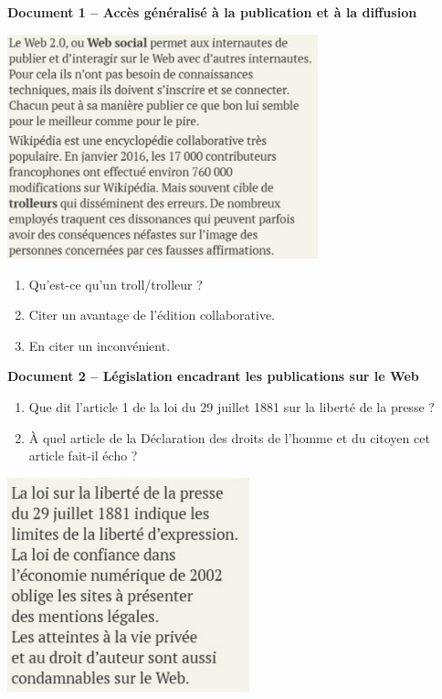 \documentclass[a4paper]{article}
\begin{document}
\medskip

\textbf{Document 1 -- Accès généralisé à la publication et à la diffusion} 

\begin{multicols}{2}
  \begin{center}
    \includegraphics[width=9cm]{web_2.0.png}
  \end{center}\columnbreak

  \vspace*{-3mm}

  \begin{enumerate}
    \item Qu'est-ce qu'un troll/trolleur ?
    \item Citer un avantage de l'édition collaborative.
    \item En citer un inconvénient.
  \end{enumerate}
\end{multicols}

\bigskip

\textbf{Document 2 -- Législation encadrant les publications sur le Web} 

\smallskip

\begin{multicols}{2}
  \begin{enumerate}[resume]
    \item Que dit l'article 1 de la loi du 29 juillet 1881 sur la liberté de la presse ?
    \item À quel article de la Déclaration des droits de l'homme et du citoyen cet article fait-il écho ?
  \end{enumerate}

  \begin{center}
    \includegraphics[width=7cm]{legislation_publications_web.png}
  \end{center}
\end{multicols}
\end{document}
